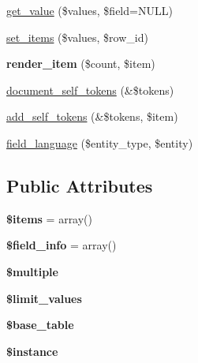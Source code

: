 \begin{DoxyCompactItemize}
\item 
\hyperlink{classviews__handler__field__field_a0f3c7e4a7197b2cc7d06e5a489012a8a}{get\_\-value} (\$values, \$field=NULL)
\item 
\hyperlink{classviews__handler__field__field_aa834effe6f1071658de6ae2bdbc8cd7b}{set\_\-items} (\$values, \$row\_\-id)
\item 
\hypertarget{classviews__handler__field__field_acb74d846bc7abb4bb5a3028824399d22}{
{\bfseries render\_\-item} (\$count, \$item)}
\label{classviews__handler__field__field_acb74d846bc7abb4bb5a3028824399d22}

\item 
\hyperlink{classviews__handler__field__field_a1e4563c5085f7188e85278770098bee0}{document\_\-self\_\-tokens} (\&\$tokens)
\item 
\hyperlink{classviews__handler__field__field_a188044611e725e210d9b538b5b91f0c9}{add\_\-self\_\-tokens} (\&\$tokens, \$item)
\item 
\hyperlink{classviews__handler__field__field_a1c0592717f7babeb9adf9c9e3193024b}{field\_\-language} (\$entity\_\-type, \$entity)
\end{DoxyCompactItemize}
\subsection*{Public Attributes}
\begin{DoxyCompactItemize}
\item 
\hypertarget{classviews__handler__field__field_af95c963677128e4eaea4dcf833373bf3}{
{\bfseries \$items} = array()}
\label{classviews__handler__field__field_af95c963677128e4eaea4dcf833373bf3}

\item 
\hypertarget{classviews__handler__field__field_a8238f4f5c55112365d7d9f6e358e4316}{
{\bfseries \$field\_\-info} = array()}
\label{classviews__handler__field__field_a8238f4f5c55112365d7d9f6e358e4316}

\item 
\hypertarget{classviews__handler__field__field_a4bcc851cdd1fc25577858a2389a9a8fc}{
{\bfseries \$multiple}}
\label{classviews__handler__field__field_a4bcc851cdd1fc25577858a2389a9a8fc}

\item 
\hypertarget{classviews__handler__field__field_a34c55bc5c027bc8430c1d97a22d0ba15}{
{\bfseries \$limit\_\-values}}
\label{classviews__handler__field__field_a34c55bc5c027bc8430c1d97a22d0ba15}

\item 
\hypertarget{classviews__handler__field__field_ab8d4f174ab708571222e7cef38f36d03}{
{\bfseries \$base\_\-table}}
\label{classviews__handler__field__field_ab8d4f174ab708571222e7cef38f36d03}

\item 
\hypertarget{classviews__handler__field__field_ac0bed1e315a9eabb3c536befbb705495}{
{\bfseries \$instance}}
\label{classviews__handler__field__field_ac0bed1e315a9eabb3c536befbb705495}

\end{DoxyCompactItemize}


